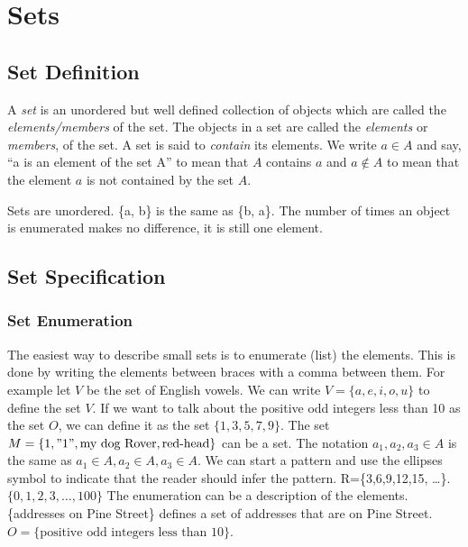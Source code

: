 


  



\chapter {Sets}

\section {Set Definition}

\begin {definition}
A \textit{set} is an unordered but well defined collection of objects which are called the \textit{elements/members} of the set.  The objects in a set are called the \textit{elements} or \textit{members}, of the set. A set is said to \textit{contain} its elements. We write $a \in A$ and say, ``a is an element of the set A'' to mean that $A$ contains $a$ and $a \notin A$ to mean that the element $a$ is not contained by the set $A$.
\end {definition}

\begin{notes}
   Sets are unordered. \{a, b\} is the same as \{b, a\}. The number of times an object is enumerated makes no difference, it is still one element.
\end{notes}


  \section{Set Specification}
    \subsection {Set Enumeration}
  The easiest way to describe small sets is to enumerate (list) the elements. This is done by writing the elements between braces with a comma between them. For example let $V$ be the set of English vowels. We can write $V=\{a,e,i,o,u\}$ to define the set $V$. If we want to talk about the positive odd integers less than 10 as the set $O$, we can define it as the set $\{1,3,5,7,9\}$. 
The set $M=\{1, "1", \text{my dog Rover}, \text{red-head}\}$ can be a set. The notation $a_1,a_2,a_3 \in A$ is the same as $a_1 \in A, a_2 \in A, a_3 \in A$. We can start a pattern and use the ellipses symbol to indicate that the reader should infer the pattern. R=\{3,6,9,12,15, \dots\}. $\{0,1,2,3, \dots ,100\}$ The enumeration can be a description of the elements. \{addresses on Pine Street\} defines a set of addresses that are on Pine Street. $O=\{ \text{positive odd integers less than 10} \}$. 



